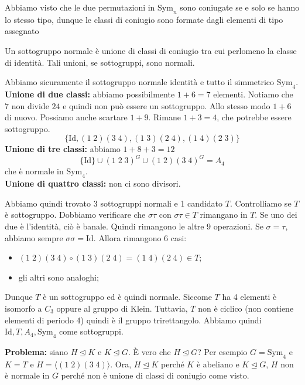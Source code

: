 \documentclass[a4paper]{article}
\begin{document}
Abbiamo visto che le due permutazioni in \(\text{Sym}_n\)
sono coniugate se e solo se hanno lo stesso tipo, dunque le classi di coniugio
sono formate dagli elementi di tipo assegnato


Un sottogruppo normale è unione di classi di coniugio
tra cui perlomeno la classe di identità.
Tali unioni, se sottogruppi, sono normali.

Abbiamo sicuramente il sottogruppo normale identità e tutto il simmetrico \(\text{Sym}_4\).
\textbf{Unione di due classi:} abbiamo possibilmente \(1+6 = 7\)
elementi. Notiamo che \(7\) non divide \(24\) e quindi non può essere un sottogruppo.
Allo stesso modo \(1+6\) di nuovo. Possiamo anche scartare \(1+9\).
Rimane \(1+3=4\), che potrebbe essere sottogruppo.
\[
    \{\text{Id}, (1\;2)(3\;4), (1\;3)(2\;4), (1\;4)(2\;3)\}
\]
\textbf{Unione di tre classi:} abbiamo \(1+8+3 = 12\)
\[
    \{\text{Id}\} \cup {(1\;2\;3)}^G \cup {(1\;2)(3\; 4)}^G = A_4
\]
che è normale in \(\text{Sym}_4\).\\
\textbf{Unione di quattro classi:} non ci sono divisori.

Abbiamo quindi trovato \(3\) sottogruppi normali e 1 candidato \(T\).
Controlliamo se \(T\) è sottogruppo.
Dobbiamo verificare che \(\sigma\tau\) con \(\sigma\tau \in T\) rimangano in \(T\).
Se uno dei due è l'identità, ciò è banale. Quindi rimangono le altre 9 operazioni.
Se \(\sigma = \tau\), abbiamo sempre \(\sigma\sigma = \text{Id}\).
Allora rimangono 6 casi:
\begin{itemize}
    \item \((1\;2)(3\;4)\circ (1\;3)(2\;4) = (1\;4)(2\;4) \in T\);
    \item gli altri sono analoghi;
\end{itemize}
Dunque \(T\) è un sottogruppo ed è quindi normale.
Siccome \(T\) ha 4 elementi è isomorfo a \(C_3\) oppure al gruppo di Klein.
Tuttavia, \(T\) non è ciclico (non contiene elementi di periodo 4) quindi è il gruppo trirettangolo.
Abbiamo quindi \(\text{Id}, T, A_4, \text{Sym}_4\) come sottogruppi.

\textbf{Problema:} siano \(H \unlhd K\)
e \(K \unlhd G\). È vero che \(H \unlhd G\)? Per esempio \(G = \text{Sym}_4\)
e \(K=T\) e \(H = \langle(1\;2)(3\;4)\rangle\).
Ora, \(H \unlhd K\) perché \(K\) è abeliano e \(K \unlhd G\),
\(H\) non è normale in \(G\) perché non è unione di classi di coniugio come visto.
\end{document}
